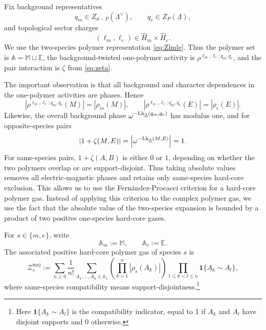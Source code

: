 Fix background representatives
\begin{equation}
q_m\in Z_{d-P}(\underline\Lambda^\vee),
\qquad
q_e\in Z_P(\underline\Lambda),
\end{equation}
and topological sector charges
\begin{equation}
(\ell_m,\ell_e)\in \widehat H_m\times \widehat H_e.
\end{equation}
We use the two-species polymer representation
\eqref{eq:Zlmle}. Thus the polymer set is
$\mathbb A=\mathbb M \sqcup\mathbb E $,
the background-twisted one-polymer activity is
\(\rho^{\ell_m,\ell_e;q_m,q_e}\), and the pair interaction is \(\zeta\) from
\eqref{eq:zeta}.

The important observation is that all background and character dependences in the
one-polymer activities are phases. Hence
\begin{equation}
	\left|\rho^{\ell_m,\ell_e;q_m,q_e}(M)\right|
	=
	|\rho_m(M)|,
	\qquad
	\left|\rho^{\ell_m,\ell_e;q_m,q_e}(E)\right|
	=
	|\rho_e(E)|.
	\label{eq:background-activity-moduli}
\end{equation}
Likewise, the overall background phase
\(\omega^{-\mathrm{Lk}_{\underline\Lambda}(q_m,q_e)}\) has modulus one, and for
opposite-species pairs
\begin{equation}
	|1+\zeta(M,E)|
	=
	\left|\omega^{-\mathrm{Lk}_{\underline\Lambda}(M,E)}\right|
	=
	1.
	\label{eq:opposite-phase-modulus}
\end{equation}
For same-species pairs, \(1+\zeta(A,B)\) is either \(0\) or \(1\), depending on whether the
two polymers overlap or are support-disjoint. Thus taking absolute values removes all
electric-magnetic phases and retains only same-species hard-core exclusion. This allows us to use the Fern\'andez-Procacci criterion \cite{FernandezProcacci2007} for a hard-core polymer gas. Instead of applying this criterion to the complex polymer gas, we use the fact that the absolute value of the two-species expansion is bounded by a product of two positive one-species hard-core gases.



For \(s\in\{m,e\}\), write
\begin{equation}
\mathbb A_m:=\mathbb M ,
\qquad
\mathbb A_e:=\mathbb E .
\end{equation}
The associated positive hard-core polymer gas of species \(s\) is
\begin{equation}
	\mathcal Z_s^{\mathrm{maj}}
	:=
	\sum_{n\ge 0}
	\frac{1}{n!}
	\sum_{A_1,\dots,A_n\in \mathbb A_s}
	\left(\prod_{k=1}^n |\rho_s(A_k)|\right)
	\prod_{1\le k<l\le n}\mathbf 1\{A_k\sim A_l\},
	\label{eq:majorant-gas}
\end{equation}
where same-species compatibility means support-disjointness.\footnote{Here $\mathbf 1\{A_k\sim A_l\}$ is the compatibility indicator, equal to 1 if $A_k$ and $A_l$ have disjoint supports and 0 otherwise.}

